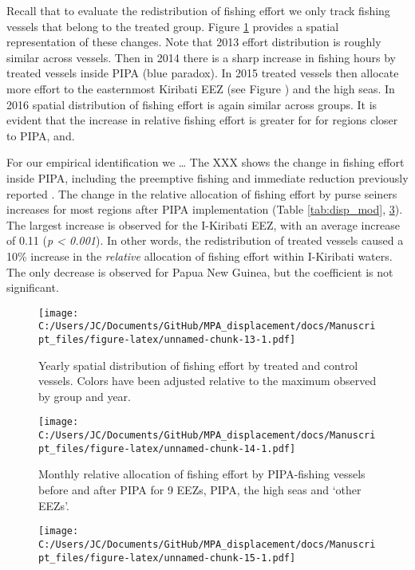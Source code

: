 \documentclass[11pt,]{article}
\begin{document}
Recall that to evaluate the redistribution of fishing effort we only
track fishing vessels that belong to the treated group. Figure
\ref{fig:fishing_raster} provides a spatial representation of these
changes. Note that 2013 effort distribution is roughly similar across
vessels. Then in 2014 there is a sharp increase in fishing hours by
treated vessels inside PIPA (blue paradox). In 2015 treated vessels then
allocate more effort to the easternmost Kiribati EEZ (see Figure
\label{fig:PNA_map}) and the high seas. In 2016 spatial distribution of
fishing effort is again similar across groups. It is evident that the
increase in relative fishing effort is greater for for regions closer to
PIPA, and.

For our empirical identification we \ldots{} The XXX shows the change in
fishing effort inside PIPA, including the preemptive fishing and
immediate reduction previously reported \citep{mcdermott_2018}. The
change in the relative allocation of fishing effort by purse seiners
increases for most regions after PIPA implementation (Table
\ref{tab:disp_mod}, \ref{fig:mean_change}). The largest increase is
observed for the I-Kiribati EEZ, with an average increase of 0.11
(\emph{p \textless{} 0.001}). In other words, the redistribution of
treated vessels caused a 10\% increase in the \emph{relative} allocation
of fishing effort within I-Kiribati waters. The only decrease is
observed for Papua New Guinea, but the coefficient is not significant.

\begin{figure}
\centering
\texttt{[image: C:/Users/JC/Documents/GitHub/MPA\_displacement/docs/Manuscript\_files/figure-latex/unnamed-chunk-13-1.pdf]}
\caption{\label{fig:unnamed-chunk-13}\label{fig:fishing_raster}Yearly
spatial distribution of fishing effort by treated and control vessels.
Colors have been adjusted relative to the maximum observed by group and
year.}
\end{figure}

\begin{figure}
\centering
\texttt{[image: C:/Users/JC/Documents/GitHub/MPA\_displacement/docs/Manuscript\_files/figure-latex/unnamed-chunk-14-1.pdf]}
\caption{\label{fig:unnamed-chunk-14}\label{fig:redist_trend_ps}Monthly
relative allocation of fishing effort by PIPA-fishing vessels before and
after PIPA for 9 EEZs, PIPA, the high seas and `other EEZs'.}
\end{figure}

\begin{figure}
\centering
\texttt{[image: C:/Users/JC/Documents/GitHub/MPA\_displacement/docs/Manuscript\_files/figure-latex/unnamed-chunk-15-1.pdf]}
\caption{\label{fig:unnamed-chunk-15}\label{fig:mean_change}}
\end{figure}
\end{document}

